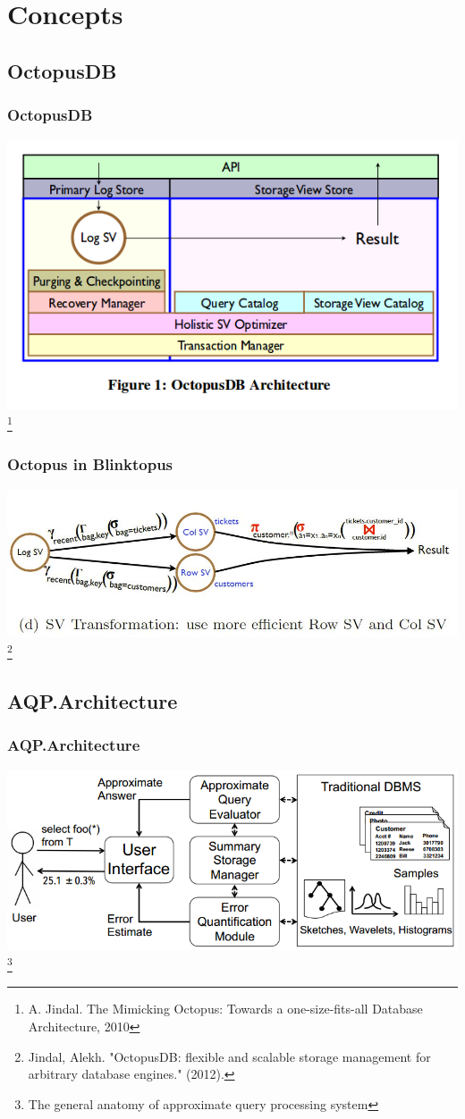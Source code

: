 \documentclass{beamer}
\begin{document}
\section{Concepts}
\subsection{OctopusDB}
\begin{frame}
\frametitle{OctopusDB}
\includegraphics[scale=0.4]{img/octopus_arch.png}
\footnote{A. Jindal. The Mimicking Octopus: Towards a one-size-fits-all Database Architecture, 2010}
\end{frame}

\begin{frame}
\frametitle{Octopus in Blinktopus}
\includegraphics[scale=0.4]{img/SV_transformation.JPG}
\footnote{Jindal, Alekh. "OctopusDB: flexible and scalable storage management for arbitrary database engines." (2012).}
\end{frame}

\subsection{AQP.Architecture}
\begin{frame}
\frametitle{AQP.Architecture}
\includegraphics[scale=0.5]{img/blinkdb-workflow.png}
\footnote{The general anatomy of approximate query processing system}
\end{frame}
\end{document}
